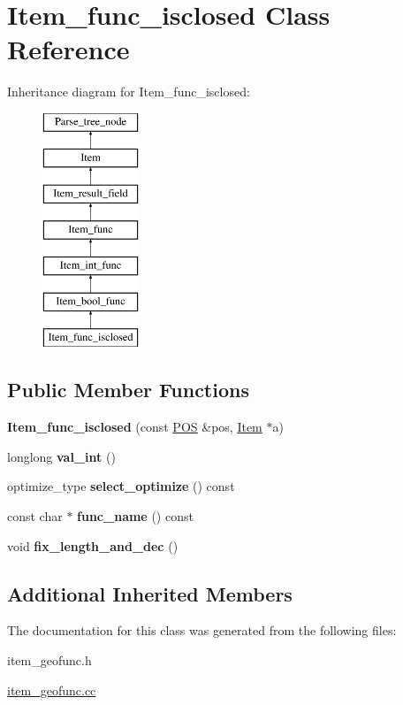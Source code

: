 \hypertarget{classItem__func__isclosed}{}\section{Item\+\_\+func\+\_\+isclosed Class Reference}
\label{classItem__func__isclosed}
Inheritance diagram for Item\+\_\+func\+\_\+isclosed\+:\begin{figure}[H]
\begin{center}
\leavevmode
\includegraphics[height=7.000000cm]{classItem__func__isclosed}
\end{center}
\end{figure}
\subsection*{Public Member Functions}
\begin{DoxyCompactItemize}
\item 
\mbox{\label{classItem__func__isclosed_a3447c41c053f43bb8668b1239829f116}} 
{\bfseries Item\+\_\+func\+\_\+isclosed} (const \mbox{\hyperlink{structYYLTYPE}{P\+OS}} \&pos, \mbox{\hyperlink{classItem}{Item}} $\ast$a)
\item 
\mbox{\label{classItem__func__isclosed_aa387961b4360dbbfe34f2db616081077}} 
longlong {\bfseries val\+\_\+int} ()
\item 
\mbox{\label{classItem__func__isclosed_ac5c722bc18d42ff35151b2a959d7e5ac}} 
optimize\+\_\+type {\bfseries select\+\_\+optimize} () const
\item 
\mbox{\label{classItem__func__isclosed_a38a9653411f7175eccd4fa2476a65d35}} 
const char $\ast$ {\bfseries func\+\_\+name} () const
\item 
\mbox{\label{classItem__func__isclosed_abddd9b6cc7fac41cde33eaf0edc9e9d7}} 
void {\bfseries fix\+\_\+length\+\_\+and\+\_\+dec} ()
\end{DoxyCompactItemize}
\subsection*{Additional Inherited Members}


The documentation for this class was generated from the following files\+:\begin{DoxyCompactItemize}
\item 
item\+\_\+geofunc.\+h\item 
\mbox{\hyperlink{item__geofunc_8cc}{item\+\_\+geofunc.\+cc}}\end{DoxyCompactItemize}
